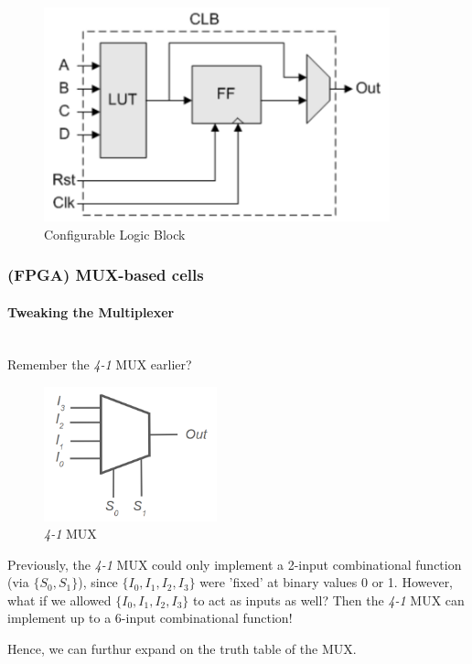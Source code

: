 \documentclass{article}
\begin{document}
\begin{figure}[htp]
    \centering
    \includegraphics[width=10cm, scale=1]{S2/CLB.PNG}
    \caption{Configurable Logic Block}
\end{figure}


\subsubsection{(FPGA) MUX-based cells}

\paragraph{Tweaking the Multiplexer}\mbox{}\\
Remember the \textit{4-1} MUX earlier?

\begin{figure}[htp]
    \centering
    \includegraphics[width=5cm, scale=1]{S2/muxTweak.PNG}
    \caption{\textit{4-1} MUX}
\end{figure}

Previously, the \textit{4-1} MUX could only implement a 2-input combinational function (via $\{S_{0}, S_{1}\}$), since $\{I_{0},I_{1},I_{2},I_{3}\}$ were 'fixed' at binary values 0 or 1.
However, what if we allowed $\{I_{0},I_{1},I_{2},I_{3}\}$ to act as inputs as well? Then the \textit{4-1} MUX can implement up to a 6-input combinational function!


Hence, we can furthur expand on the truth table of the MUX.
\end{document}
